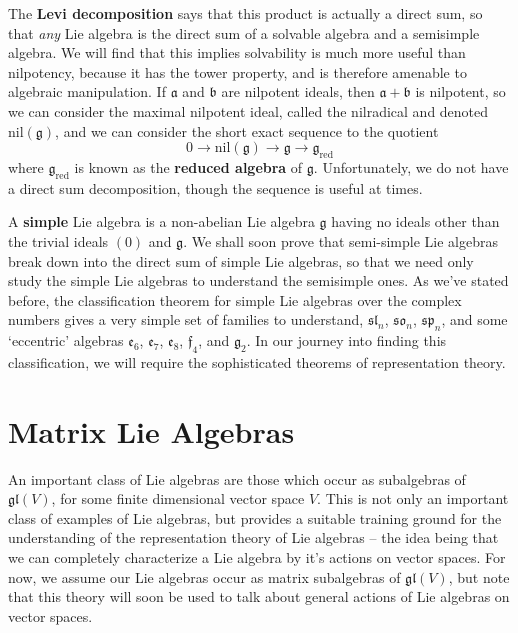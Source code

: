 The {\bf Levi decomposition} says that this product is actually a direct sum, so that {\it any} Lie algebra is the direct sum of a solvable algebra and a semisimple algebra. We will find that this implies solvability is much more useful than nilpotency, because it has the tower property, and is therefore amenable to algebraic manipulation. If $\mathfrak{a}$ and $\mathfrak{b}$ are nilpotent ideals, then $\mathfrak{a} + \mathfrak{b}$ is nilpotent, so we can consider the maximal nilpotent ideal, called the nilradical and denoted $\text{nil}(\mathfrak{g})$, and we can consider the short exact sequence to the quotient
%
\[ 0 \to \text{nil}(\mathfrak{g}) \to \mathfrak{g} \to \mathfrak{g}_{\text{red}} \]
%
where $\mathfrak{g}_{\text{red}}$ is known as the {\bf reduced algebra} of $\mathfrak{g}$. Unfortunately, we do not have a direct sum decomposition, though the sequence is useful at times.

A {\bf simple} Lie algebra is a non-abelian Lie algebra $\mathfrak{g}$ having no ideals other than the trivial ideals $(0)$ and $\mathfrak{g}$. We shall soon prove that semi-simple Lie algebras break down into the direct sum of simple Lie algebras, so that we need only study the simple Lie algebras to understand the semisimple ones. As we've stated before, the classification theorem for simple Lie algebras over the complex numbers gives a very simple set of families to understand, $\mathfrak{sl}_n$, $\mathfrak{so}_n$, $\mathfrak{sp}_n$, and some `eccentric' algebras $\mathfrak{e}_6$, $\mathfrak{e}_7$, $\mathfrak{e}_8$, $\mathfrak{f}_4$, and $\mathfrak{g}_2$. In our journey into finding this classification, we will require the sophisticated theorems of representation theory.






\chapter{Matrix Lie Algebras}

An important class of Lie algebras are those which occur as subalgebras of $\mathfrak{gl}(V)$, for some finite dimensional vector space $V$. This is not only an important class of examples of Lie algebras, but provides a suitable training ground for the understanding of the representation theory of Lie algebras -- the idea being that we can completely characterize a Lie algebra by it's actions on vector spaces. For now, we assume our Lie algebras occur as matrix subalgebras of $\mathfrak{gl}(V)$, but note that this theory will soon be used to talk about general actions of Lie algebras on vector spaces.

